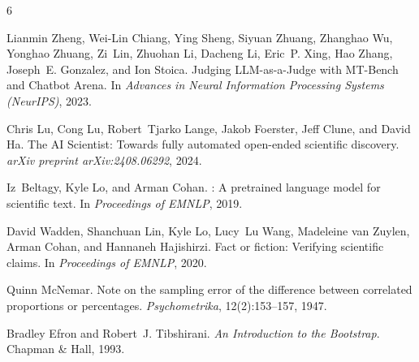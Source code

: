 \documentclass[11pt,a4paper]{article}
\begin{document}
\begin{thebibliography}{6}

Lianmin Zheng, Wei-Lin Chiang, Ying Sheng, Siyuan Zhuang, Zhanghao Wu,
Yonghao Zhuang, Zi~Lin, Zhuohan Li, Dacheng Li, Eric~P. Xing, Hao Zhang,
Joseph~E. Gonzalez, and Ion Stoica.
\newblock Judging {LLM}-as-a-{J}udge with {MT-B}ench and {C}hatbot {A}rena.
\newblock In \emph{Advances in Neural Information Processing Systems (NeurIPS)},
  2023.

Chris Lu, Cong Lu, Robert~Tjarko Lange, Jakob Foerster, Jeff Clune, and
David Ha.
\newblock The {AI} {S}cientist: Towards fully automated open-ended scientific
  discovery.
\newblock \emph{arXiv preprint arXiv:2408.06292}, 2024.

Iz~Beltagy, Kyle Lo, and Arman Cohan.
: A pretrained language model for scientific text.
\newblock In \emph{Proceedings of EMNLP}, 2019.

David Wadden, Shanchuan Lin, Kyle Lo, Lucy~Lu Wang, Madeleine van Zuylen,
Arman Cohan, and Hannaneh Hajishirzi.
\newblock Fact or fiction: Verifying scientific claims.
\newblock In \emph{Proceedings of EMNLP}, 2020.

Quinn McNemar.
\newblock Note on the sampling error of the difference between correlated
  proportions or percentages.
\newblock \emph{Psychometrika}, 12(2):153--157, 1947.

Bradley Efron and Robert~J. Tibshirani.
\newblock \emph{An Introduction to the Bootstrap}.
\newblock Chapman \& Hall, 1993.

\end{thebibliography}
\end{document}
